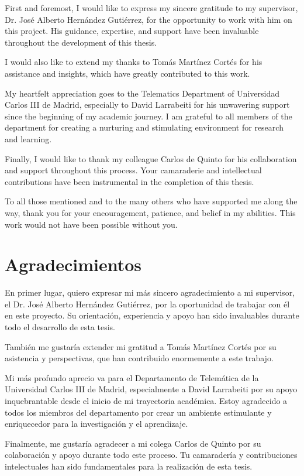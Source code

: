 \documentclass[oneside, 12pt, a4paper]{book}
\begin{document}
First and foremost, I would like to express my sincere gratitude to my supervisor, Dr. José Alberto Hernández Gutiérrez, for the opportunity to work with him on this project. His guidance, expertise, and support have been invaluable throughout the development of this thesis.

I would also like to extend my thanks to Tomás Martínez Cortés for his assistance and insights, which have greatly contributed to this work.

My heartfelt appreciation goes to the Telematics Department of Universidad Carlos III de Madrid, especially to David Larrabeiti for his unwavering support since the beginning of my academic journey. I am grateful to all members of the department for creating a nurturing and stimulating environment for research and learning.

Finally, I would like to thank my colleague Carlos de Quinto for his collaboration and support throughout this process. Your camaraderie and intellectual contributions have been instrumental in the completion of this thesis.

To all those mentioned and to the many others who have supported me along the way, thank you for your encouragement, patience, and belief in my abilities. This work would not have been possible without you.

\chapter*{Agradecimientos}

En primer lugar, quiero expresar mi más sincero agradecimiento a mi supervisor, el Dr. José Alberto Hernández Gutiérrez, por la oportunidad de trabajar con él en este proyecto. Su orientación, experiencia y apoyo han sido invaluables durante todo el desarrollo de esta tesis.

También me gustaría extender mi gratitud a Tomás Martínez Cortés por su asistencia y perspectivas, que han contribuido enormemente a este trabajo.

Mi más profundo aprecio va para el Departamento de Telemática de la Universidad Carlos III de Madrid, especialmente a David Larrabeiti por su apoyo inquebrantable desde el inicio de mi trayectoria académica. Estoy agradecido a todos los miembros del departamento por crear un ambiente estimulante y enriquecedor para la investigación y el aprendizaje.

Finalmente, me gustaría agradecer a mi colega Carlos de Quinto por su colaboración y apoyo durante todo este proceso. Tu camaradería y contribuciones intelectuales han sido fundamentales para la realización de esta tesis.
\end{document}

